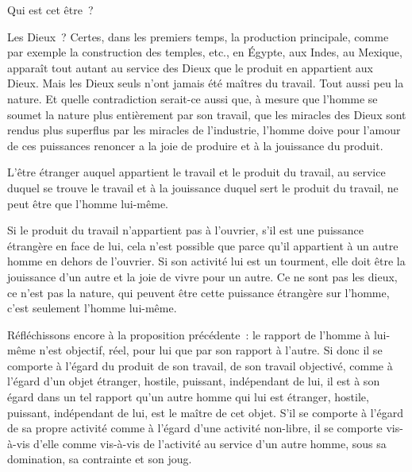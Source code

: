 \documentclass[french,twoside]{book} %
\begin{document}
Qui est cet être ?\par
Les Dieux ? Certes, dans les premiers temps, la production principale, comme par exemple la construction des temples, etc., en Égypte, aux Indes, au Mexique, apparaît tout autant au service des Dieux que le produit en appartient aux Dieux. Mais les Dieux seuls n’ont jamais été maîtres du travail. Tout aussi peu la nature. Et quelle contradiction serait-ce aussi que, à mesure que l’homme se soumet la nature plus entièrement par son travail, que les miracles des Dieux sont rendus plus superflus par les miracles de l’industrie, l’homme doive pour l’amour de ces puissances renoncer a la joie de produire et à la jouissance du produit.\par
L’être étranger auquel appartient le travail et le produit du travail, au service duquel se trouve le travail et à la jouissance duquel sert le produit du travail, ne peut être que l’homme lui-même.\par
Si le produit du travail n’appartient pas à l’ouvrier, s’il est une puissance étrangère en face de lui, cela n’est possible que parce qu’il appartient à un autre homme en dehors de l’ouvrier. Si son activité lui est un tourment, elle doit être la jouissance d’un autre et la joie de vivre pour un autre. Ce ne sont pas les dieux, ce n’est pas la nature, qui peuvent être cette puissance étrangère sur l’homme, c’est seulement l’homme lui-même.\par
Réfléchissons encore à la proposition précédente : le rapport de l’homme à lui-même n’est objectif, réel, pour lui que par son rapport à l’autre. Si donc il se comporte à l’égard du produit de son travail, de son travail objectivé, comme à l’égard d’un objet étranger, hostile, puissant, indépendant de lui, il est à son égard dans un tel rapport qu’un autre homme qui lui est étranger, hostile, puissant, indépendant de lui, est le maître de cet objet. S’il se comporte à l’égard de sa propre activité comme à l’égard d’une activité non-libre, il se comporte vis-à-vis d’elle comme vis-à-vis de l’activité au service d’un autre homme, sous sa domination, sa contrainte et son joug.\par
\end{document}
